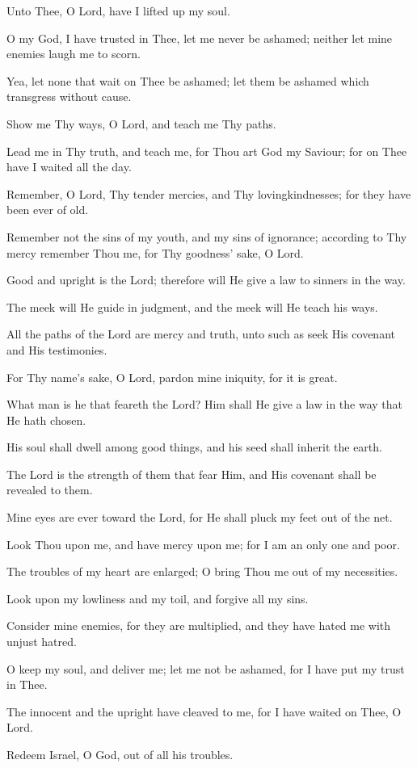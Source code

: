 Unto Thee, O Lord, have I lifted up my soul.

O my God, I have trusted in Thee, let me never be ashamed; neither let mine enemies laugh me to scorn.

Yea, let none that wait on Thee be ashamed; let them be ashamed which transgress without cause.

Show me Thy ways, O Lord, and teach me Thy paths.

Lead me in Thy truth, and teach me, for Thou art God my Saviour; for on Thee have I waited all the day.

Remember, O Lord, Thy tender mercies, and Thy lovingkindnesses; for they have been ever of old.

Remember not the sins of my youth, and my sins of ignorance; according to Thy mercy remember Thou me, for Thy goodness’ sake, O Lord.

Good and upright is the Lord; therefore will He give a law to
sinners in the way.

The meek will He guide in judgment, and the meek will He teach his ways.

All the paths of the Lord are mercy and truth, unto such as seek His covenant and His testimonies.

For Thy name's sake, O Lord, pardon mine iniquity, for it is great.

What man is he that feareth the Lord? Him shall He give a law in the way that He hath chosen.

His soul shall dwell among good things, and his seed shall inherit the earth.

The Lord is the strength of them that fear Him, and His covenant shall be revealed to them.

Mine eyes are ever toward the Lord, for He shall pluck my feet out of the net.

Look Thou upon me, and have mercy upon me; for I am an only one and poor.

The troubles of my heart are enlarged; O bring Thou me out of my necessities.

Look upon my lowliness and my toil, and forgive all my sins.

Consider mine enemies, for they are multiplied, and they have hated me with unjust hatred.

O keep my soul, and deliver me; let me not be ashamed, for I have put my trust in Thee.

The innocent and the upright have cleaved to me, for I have waited on Thee, O Lord.

Redeem Israel, O God, out of all his troubles.
